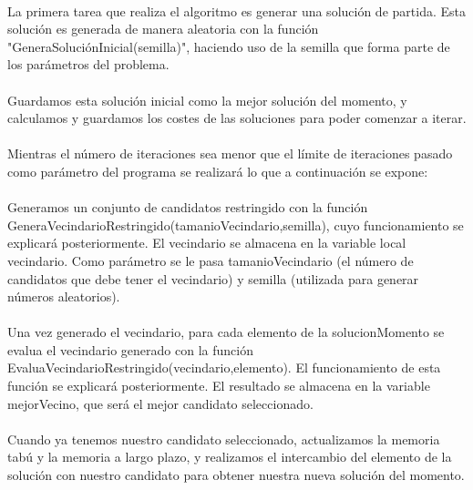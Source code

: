 \documentclass{article}
\begin{document}
		\paragraph{} La primera tarea que realiza el algoritmo es generar una solución de partida. Esta solución es generada de manera aleatoria con la función "GeneraSoluciónInicial(semilla)", haciendo uso de la semilla que forma parte de los parámetros del problema.
		
		\paragraph{}Guardamos esta solución inicial como la mejor solución del momento, y calculamos y guardamos los costes de las soluciones para poder comenzar a iterar.
		
		\paragraph{}Mientras el número de iteraciones sea menor que el límite de iteraciones pasado como parámetro del programa se realizará lo que a continuación se expone:
		
		\paragraph{}Generamos un conjunto de candidatos restringido con la función GeneraVecindarioRestringido(tamanioVecindario,semilla), cuyo funcionamiento se explicará posteriormente. El vecindario se almacena en la variable local vecindario. Como parámetro se le pasa tamanioVecindario (el número de candidatos que debe tener el vecindario) y semilla (utilizada para generar números aleatorios).
		
		\paragraph{}Una vez generado el vecindario, para cada elemento de la solucionMomento se evalua el vecindario generado con la función EvaluaVecindarioRestringido(vecindario,elemento). El funcionamiento de esta función se explicará posteriormente. El resultado se almacena en la variable mejorVecino, que será el mejor candidato seleccionado.
		
		\paragraph{}Cuando ya tenemos nuestro candidato seleccionado, actualizamos la memoria tabú y la memoria a largo plazo, y realizamos el intercambio del elemento de la solución con nuestro candidato para obtener nuestra nueva solución del momento.
		
\end{document}
